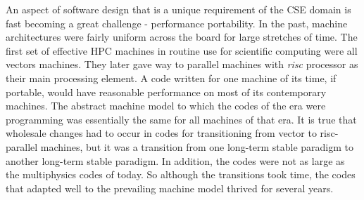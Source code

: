 \label{sec:future}

An aspect of software design that is a unique requirement of
the CSE domain is fast becoming a great challenge - performance
portability. In the past, machine architectures were fairly uniform
across the board for large stretches of time.  The first set of
effective HPC machines in routine use for scientific computing were
all vectors machines. They later gave way to parallel machines with
{\em risc} processor as their main processing element. A code written
for one machine of its time, if portable, would have reasonable
performance on most of its contemporary machines. The abstract machine
model to which the codes of the era were programming was essentially
the same for all machines of that era. It is true that wholesale changes had to occur
in codes for transitioning from vector to risc-parallel machines, but
it was a transition from one long-term stable paradigm to another
long-term stable paradigm.  In addition, the codes were not as large as the
multiphysics codes of today. So although the transitions took time, the
codes that adapted well to the prevailing machine model thrived for
several years.  

